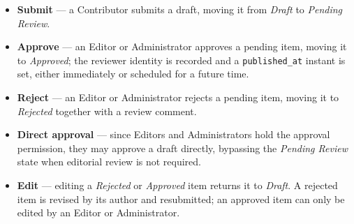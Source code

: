 \begin{itemize}
      \item \textbf{Submit} --- a Contributor submits a draft, moving it from
            \textit{Draft} to \textit{Pending Review}.

      \item \textbf{Approve} --- an Editor or Administrator approves a pending item,
            moving it to \textit{Approved}; the reviewer identity is recorded and a
            \texttt{published\_at} instant is set, either immediately or scheduled for a
            future time.

      \item \textbf{Reject} --- an Editor or Administrator rejects a pending item,
            moving it to \textit{Rejected} together with a review comment.

      \item \textbf{Direct approval} --- since Editors and Administrators hold the
            approval permission, they may approve a draft directly, bypassing the
            \textit{Pending Review} state when editorial review is not required.

      \item \textbf{Edit} --- editing a \textit{Rejected} or \textit{Approved} item
            returns it to \textit{Draft}. A rejected item is revised by its author and
            resubmitted; an approved item can only be edited by an Editor or
            Administrator.
\end{itemize}
